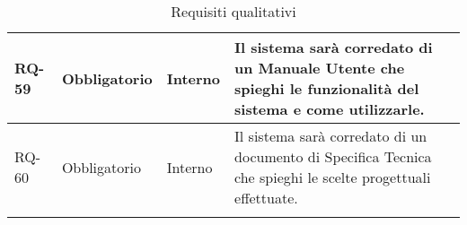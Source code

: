 \begin{longtable}{|>{\centering\arraybackslash}m{}|>{\centering\arraybackslash}m{}|>{\centering\arraybackslash}m{}|>{\centering\arraybackslash}m{}|}
	\\\hline
	RQ-59           & Obbligatorio        & Interno                                                                                                                                                                                                                                              & Il sistema sarà corredato di un Manuale Utente che spieghi le funzionalità del sistema e come utilizzarle.
	\\\hline
	RQ-60           & Obbligatorio        & Interno                                                                                                                                                                                                                                              & Il sistema sarà corredato di un documento di Specifica Tecnica che spieghi le scelte progettuali effettuate.
	\\\hline
	\caption{Requisiti qualitativi}
\end{longtable}

\newpage

